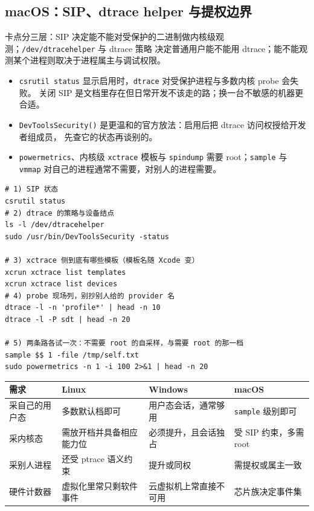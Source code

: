 \documentclass[12pt,a4paper,fontset=fandol]{ctexbook}
\newcommand{\Fn}[1]{\texttt{#1()}}
\newcommand{\Tp}[1]{\texttt{#1}}
\newcommand{\Bk}{\discretionary{}{}{}}
\begin{document}
\subsection{macOS：SIP、dtrace helper 与提权边界}

卡点分三层：SIP 决定能不能对受保护的二进制做内核级观测；\Tp{/dev/dtracehelper} 与 dtrace 策略
决定普通用户能不能用 dtrace；能不能观测某个进程则取决于进程属主与调试权限。

\begin{itemize}
  \item \Tp{csrutil status} 显示启用时，\Tp{dtrace} 对受保护进程与多数内核 probe 会失败。
        关闭 SIP 是文档里存在但日常开发不该走的路；换一台不敏感的机器更合适。
  \item \Fn{DevTools{\Bk}Security} 是更温和的官方放法：启用后把 dtrace 访问权授给开发者组成员，
        先查它的状态再谈别的。
  \item \Tp{powermetrics}、内核级 \Tp{xctrace} 模板与 \Tp{spindump} 需要 root；\Tp{sample} 与
        \Tp{vmmap} 对自己的进程通常不需要，对别人的进程需要。
\end{itemize}

\begin{lstlisting}[style=shellstyle, caption={macOS 权限与可用性自查}, label={lst:pmapA-mac-perm}]
# 1) SIP 状态
csrutil status
# 2) dtrace 的策略与设备结点
ls -l /dev/dtracehelper
sudo /usr/bin/DevToolsSecurity -status

# 3) xctrace 侧到底有哪些模板（模板名随 Xcode 变）
xcrun xctrace list templates
xcrun xctrace list devices
# 4) probe 现场列，别抄别人给的 provider 名
dtrace -l -n 'profile*' | head -n 10
dtrace -l -P sdt | head -n 20

# 5) 两条路各试一次：不需要 root 的自采样，与需要 root 的那一档
sample $$ 1 -file /tmp/self.txt
sudo powermetrics -n 1 -i 100 2>&1 | head -n 20
\end{lstlisting}

\begin{compare}[title={同一需求在三平台上的最低门槛}]
\begin{tabular}{>{\raggedright\arraybackslash}p{}
                >{\raggedright\arraybackslash}p{}
                >{\raggedright\arraybackslash}p{}
                >{\raggedright\arraybackslash}p{}}
需求 & Linux & Windows & macOS \\
\hline
采自己的用户态 & 多数默认档即可 & 用户态会话，通常够用 & \Tp{sample} 级别即可 \\
采内核态 & 需放开档并具备相应能力位 & 必须提升，且会话独占 & 受 SIP 约束，多需 root \\
采别人进程 & 还受 ptrace 语义约束 & 提升或同权 & 需提权或属主一致 \\
硬件计数器 & 虚拟化里常只剩软件事件 & 云虚拟机上常直接不可用 & 芯片族决定事件集 \\
\hline
\end{tabular}
\end{compare}
\end{document}
